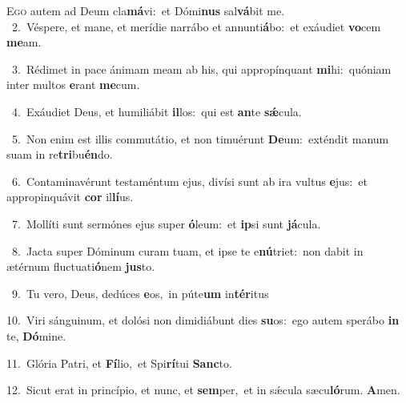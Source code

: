 \lettrine{\initial\textcolor{\initialcolor}{E}}{go} autem ad Deum cla\-\textbf{má}\-vi:~\star et Dómi\textbf{nus} sal\-\textbf{vá}\-bit me.\\
{\numbfont\textcolor{\numbcolor}{~2.}}~Véspere, et mane, et merídie narrábo et annunti\-\textbf{á}\-bo:~\star et exáudiet \textbf{vo}\-cem \textbf{me}\-am.\par
{\numbfont\textcolor{\numbcolor}{~3.}}~Rédimet in pace ánimam meam ab his, qui appropínquant \textbf{mi}\-hi:~\star quóniam inter multos \textbf{e}\-rant \textbf{me}\-cum.\par
{\numbfont\textcolor{\numbcolor}{~4.}}~Exáudiet Deus, et humiliábit \textbf{il}\-los:~\star qui est \textbf{an}\-te \textbf{sǽ}\-cula.\par
{\numbfont\textcolor{\numbcolor}{~5.}}~Non enim est illis commutátio, et non timuérunt \textbf{De}\-um:~\star exténdit manum suam in re\-\textbf{tri}\-bu\-\textbf{én}\-do.\par
{\numbfont\textcolor{\numbcolor}{~6.}}~Contaminavérunt testaméntum ejus, divísi sunt ab ira vultus \textbf{e}\-jus:~\star et appropinquávit \textbf{cor} il\-\textbf{lí}\-us.\par
{\numbfont\textcolor{\numbcolor}{~7.}}~Mollíti sunt sermónes ejus super \textbf{ó}\-leum:~\star et \textbf{ip}\-si sunt \textbf{já}\-cula.\par
{\numbfont\textcolor{\numbcolor}{~8.}}~Jacta super Dóminum curam tuam, et ipse te e\-\textbf{nú}\-triet:~\star non dabit in ætérnum fluctuati\-\textbf{ó}\-nem \textbf{jus}\-to.\par
{\numbfont\textcolor{\numbcolor}{~9.}}~Tu vero, Deus, dedúces \textbf{e}\-os,~\star in púte\textbf{um} in\-\textbf{tér}\-itus\par
{\numbfont\textcolor{\numbcolor}{10.}}~Viri sánguinum, et dolósi non dimidiábunt dies \textbf{su}\-os:~\star ego autem sperábo \textbf{in} te, \textbf{Dó}\-mine.\par
{\numbfont\textcolor{\numbcolor}{11.}}~Glória Patri, et \textbf{Fí}\-lio,~\star et Spi\-\textbf{rí}\-tui \textbf{Sanc}\-to.\par
{\numbfont\textcolor{\numbcolor}{12.}}~Sicut erat in princípio, et nunc, et \textbf{sem}\-per,~\star et in sǽcula sæcu\-\textbf{ló}\-rum. \textbf{A}\-men.\par
